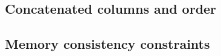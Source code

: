 \subsection{Concatenated columns and order}       
\subsection{Memory consistency constraints}       
